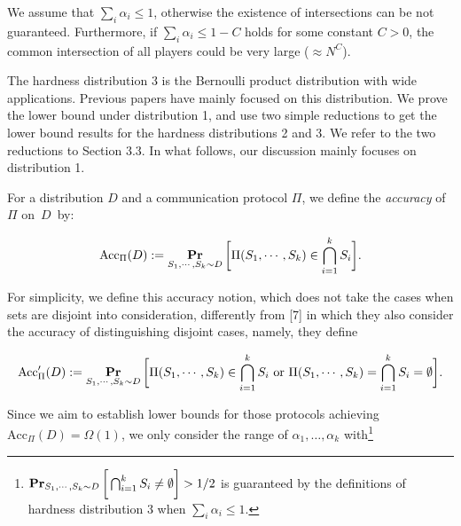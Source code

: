 \documentclass[10pt,a4paper]{article}
\begin{document}
We assume that $\sum_{i}\alpha_{i}\leq 1$, otherwise the existence of intersections can be not guaranteed. Furthermore, if $\sum_{i}\alpha_{i}\leq 1-C$ holds for some constant $C>0$, the common intersection of all players could be very large ($\approx N^{C}$).\par




The hardness distribution 3 is the Bernoulli product distribution with wide applications. Previous papers have mainly focused on this distribution. We prove the lower bound under distribution 1, and use two simple reductions to get the lower bound results for the hardness distributions 2 and 3. We refer to the two reductions to Section 3.3. In what follows, our discussion mainly focuses on distribution 1.\par




For a distribution $D$ and a communication protocol $\Pi$, we define the \emph{accuracy} of $\Pi$ on $D$ by:\par


\[\begin{gathered}
\text{Acc}_{\Pi}(D):=\operatorname*{\mathbf{Pr}}_{S_{1},\cdots,S_{k}\sim D}\bigg{[}\Pi(S_{1},\cdots,S_{k})\in\bigcap_{i=1}^{k}S_{i}\bigg{]}.
\end{gathered}\]




For simplicity, we define this accuracy notion, which does not take the cases when sets are disjoint into consideration, differently from [7] in which they also consider the accuracy of distinguishing disjoint cases, namely, they define\par


\[\begin{gathered}
\text{Acc}^{\prime}_{\Pi}(D):=\operatorname*{\mathbf{Pr}}_{S_{1},\cdots,S_{k}\sim D}\bigg{[}\Pi(S_{1},\cdots,S_{k})\in\bigcap_{i=1}^{k}S_{i}\text{ or }\Pi(S_{1},\cdots,S_{k})=\bigcap_{i=1}^{k}S_{i}=\emptyset\bigg{]}.
\end{gathered}\]


Since we aim to establish lower bounds for those protocols achieving $\text{Acc}_{\Pi}(D)=\Omega(1)$, we only consider the range of $\alpha_{1},\dots,\alpha_{k}$ with\footnote{$\operatorname*{\mathbf{Pr}}_{S_{1},\cdots,S_{k}\sim D}\bigg{[}\bigcap_{i=1}^{k}S_{i}\neq\emptyset\bigg{]}>1/2$ is guaranteed by the definitions of hardness distribution 3 when $\sum_{i}\alpha_{i}\leq 1$.}\par
\end{document}
